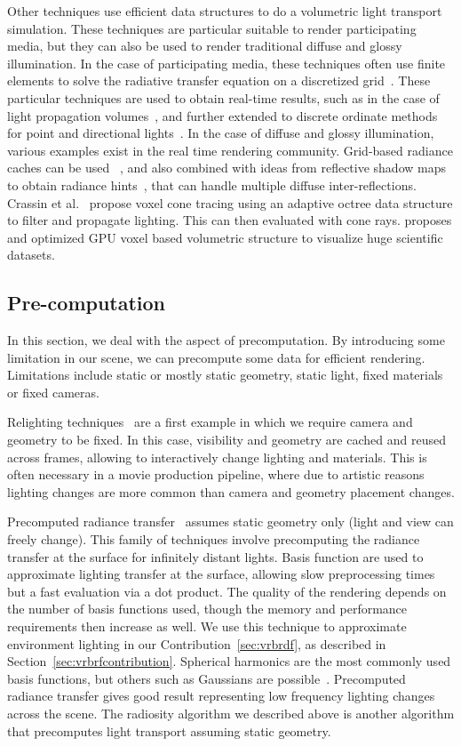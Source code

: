 Other techniques use efficient data structures to do a volumetric light transport simulation. These techniques are particular suitable to render participating media, but they can also be used to render traditional diffuse and glossy illumination. In the case of participating media, these techniques often use finite elements to solve the radiative transfer equation on a discretized grid~\cite{Fattal2009}. These particular techniques are used to obtain real-time results, such as in the case of light propagation volumes~\cite{Kaplanyan2009,Borlum2011}, and further extended to discrete ordinate methods for point and directional lights~\cite{Elek2014}. In the case of diffuse and glossy illumination, various examples exist in the real time rendering community. Grid-based radiance caches can be used ~\cite{Nijasure2005}, and also combined with ideas from reflective shadow maps to obtain radiance hints~\cite{Papaioannou2011, Vardis2014}, that can handle multiple diffuse inter-reflections.  Crassin et al.~\cite{Crassin2011} propose voxel cone tracing using an adaptive octree data structure to filter and propagate lighting. This can then evaluated with cone rays. \citet{Hoetzlein2016} proposes and optimized GPU voxel based volumetric structure to visualize huge scientific datasets. 

\subsection{Pre-computation}
In this section, we deal with the aspect of precomputation. By introducing some limitation in our scene, we can precompute some data for efficient rendering. Limitations include static or mostly static geometry, static light, fixed materials or fixed cameras. 

Relighting techniques~\cite{Nimeroff94, Pellacini2005, Hasan2006} are a first example in which we require camera and geometry to be fixed. In this case, visibility and geometry are cached and reused across frames, allowing to interactively change lighting and materials. This is often necessary in a movie production pipeline, where due to artistic reasons lighting changes are more common than camera and geometry placement changes.

Precomputed radiance transfer~\cite{Sloan2002} assumes static geometry only (light and view can freely change). This family of techniques involve precomputing the radiance transfer at the surface for infinitely distant lights. Basis function are used to approximate lighting transfer at the surface, allowing slow preprocessing times but a fast evaluation via a dot product. The quality of the rendering depends on the number of basis functions used, though the memory and performance requirements then increase as well. We use this technique to approximate environment lighting in our Contribution~\ref{sec:vrbrdf}, as described in Section~\ref{sec:vrbrfcontribution}. Spherical harmonics are the most commonly used basis functions, but others such as Gaussians are possible~\cite{Green2006}. Precomputed radiance transfer gives good result representing low frequency lighting changes across the scene. The radiosity algorithm we described above is another algorithm that precomputes light transport assuming static geometry.

